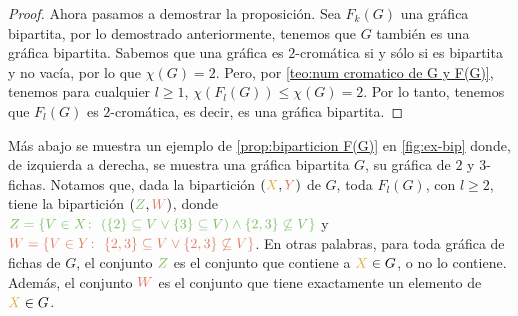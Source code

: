 \begin{proof}
    Ahora pasamos a demostrar la proposici\'on. Sea $F_k(G)$ una gr\'afica
    bipartita, por lo demostrado anteriormente, tenemos que $G$ tambi\'en es una
    gr\'afica bipartita. Sabemos que una gr\'afica es $2$-crom\'atica si y
    s\'olo si es bipartita y no vac\'ia, por lo que $\chi(G)=2$. Pero, por
    \cref{teo:num cromatico de G y F(G)}, tenemos para cualquier $l\geq 1$,
    $\chi (F_l(G)) \le \chi (G) = 2$. Por lo tanto, tenemos que $F_l(G)$ es
    $2$-crom\'atica, es decir, es una gr\'afica bipartita.
\end{proof}


M\'as abajo se muestra un ejemplo de \cref{prop:biparticion F(G)} en
\cref{fig:ex-bip} donde, de izquierda a derecha, se muestra una gr\'afica
bipartita $G$, su gr\'afica de $2$ y $3$-fichas. Notamos que, dada la
bipartici\'on $({\color{oro}X},{\color{salmon}Y})$ de $G$, toda $F_l(G)$, con
$l\geq 2$, tiene la bipartici\'on $({\color{verde}Z},{\color{salmon}W})$, donde
${\color{verde}Z=\{V\in X\colon\ (\{2\}\subseteq V  \lor \{3\} \subseteq V)
\land \{2,3\}\not\subseteq V\}}$ y ${\color{salmon}W=\{V \in Y\colon\
\{2,3\}\subseteq V \lor \{2,3\}\not\subseteq V\}}$. En otras palabras, para toda
gr\'afica de fichas de $G$, el conjunto ${\color{verde}Z}$ es el conjunto que
contiene a ${\color{oro}X}\in G$, o no lo contiene. Adem\'as, el conjunto
${\color{salmon}W}$ es el conjunto que tiene exactamente un elemento de
${\color{oro}X} \in G$.

